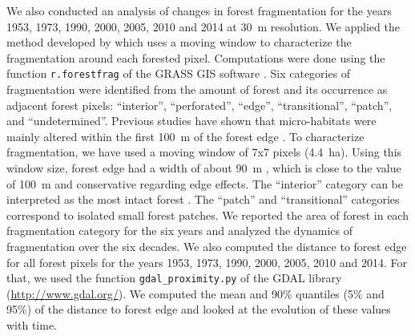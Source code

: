 \documentclass[essd, classical]{copernicus}
\begin{document}
We also conducted an analysis of changes in forest fragmentation for
the years 1953, 1973, 1990, 2000, 2005, 2010 and 2014 at 30~m
resolution. We applied the method developed by \citet{Riitters2000}
which uses a moving window to characterize the fragmentation around
each forested pixel. Computations were done using the function
\texttt{r.forestfrag} of the GRASS GIS software
\citep{Neteler2008}. Six categories of fragmentation were identified
from the amount of forest and its occurrence as adjacent forest
pixels: ``interior'', ``perforated'', ``edge'', ``transitional'',
``patch'', and ``undetermined''. Previous studies have shown that
micro-habitats were mainly altered within the first 100~m of the
forest edge \citep{Brinck2017, Gibson2013, Murcia1995,
  Broadbent2008}. To characterize fragmentation, we have used a moving
window of 7x7 pixels (4.4~ha). Using this window size, forest edge had
a width of about 90~m \citep{Riitters2000}, which is close to the
value of 100~m and conservative regarding edge effects. The
``interior'' category can be interpreted as the most intact forest
\citep{Potapov2017}. The ``patch'' and ``transitional'' categories
correspond to isolated small forest patches. We reported the area of
forest in each fragmentation category for the six years and analyzed
the dynamics of fragmentation over the six decades. We also computed
the distance to forest edge for all forest pixels for the years 1953,
1973, 1990, 2000, 2005, 2010 and 2014. For that, we used the function
\texttt{gdal\_proximity.py} of the GDAL library
(\url{http://www.gdal.org/}). We computed the mean and 90\% quantiles
(5\% and 95\%) of the distance to forest edge and looked at the
evolution of these values with time.
\end{document}
